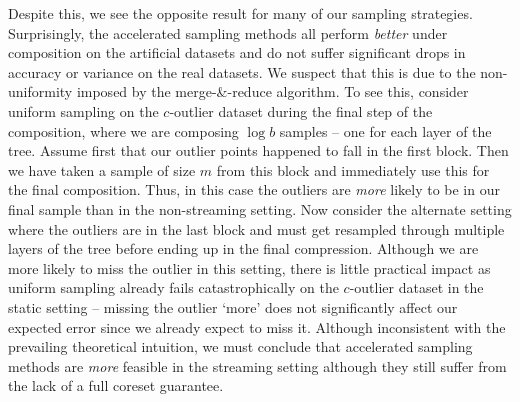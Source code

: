 Despite this, we see the opposite result for many of our sampling strategies. Surprisingly, the accelerated sampling methods all perform \emph{better} under
composition on the artificial datasets and do not suffer significant drops in accuracy or variance on the real datasets. We suspect that this is due to the
non-uniformity imposed by the merge-\&-reduce algorithm. To see this, consider uniform sampling on the $c$-outlier dataset during the final step of the
composition, where we are composing $\log b$ samples -- one for each layer of the tree. Assume first that our outlier points happened to fall in the first
block. Then we have taken a sample of size $m$ from this block and immediately use this for the final composition. Thus, in this case the outliers are
\emph{more} likely to be in our final sample than in the non-streaming setting. Now consider the alternate setting where the outliers are in the last block and
must get resampled through multiple layers of the tree before ending up in the final compression. Although we are more likely to miss the outlier in this
setting, there is little practical impact as uniform sampling already fails catastrophically on the $c$-outlier dataset in the static setting -- missing the
outlier `more' does not significantly affect our expected error since we already expect to miss it. Although inconsistent with the prevailing theoretical
intuition, we must conclude that accelerated sampling methods are \emph{more} feasible in the streaming setting although they still suffer from the lack of
a full coreset guarantee.



